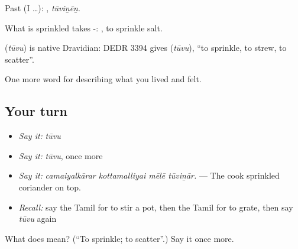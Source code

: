 Past (I …): , \emph{tūviṉēṉ}.

What is sprinkled takes -:  , to sprinkle salt.

\begin{cousinweb}
\textbf{} (\emph{tūvu}) is native Dravidian: DEDR 3394 gives  (\emph{tūvu}), \textquotedblleft{}to sprinkle, to strew, to scatter\textquotedblright{}.
\end{cousinweb}

\begin{grammarlens}[title={What you've built}]
One more word for describing what you lived and felt.
\end{grammarlens}

\subsection*{Your turn}
\begin{itemize}
\raggedright
  \item \emph{Say it:} \emph{tūvu}
  \item \emph{Say it:} \emph{tūvu}, once more
  \item \emph{Say it:} \emph{camaiyalkārar kottamalliyai mēlē tūviṉār.} — The cook sprinkled coriander on top.
  \item \emph{Recall:} say the Tamil for to stir a pot, then the Tamil for to grate, then say \emph{tūvu} again
\end{itemize}

\begin{tcolorbox}[breakable,colback=teal!4,colframe=teal!35!black,title={Before you move on}]
What does  mean? (\textquotedblleft{}To sprinkle; to scatter\textquotedblright{}.) Say it once more.
\end{tcolorbox}
